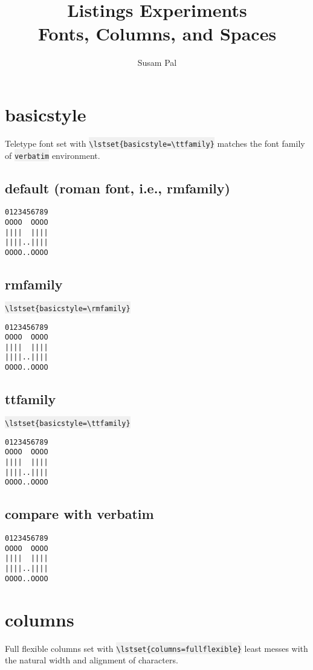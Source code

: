 \documentclass{article}
\title{Listings Experiments \\ Fonts, Columns, and Spaces}
\author{Susam Pal}
\newcommand{\bs}{\textbackslash}
\newcommand{\ttt}[1]{\colorbox[HTML]{f0f0f0}{\texttt{#1}}}
\begin{document}
\maketitle
\tableofcontents
\pagebreak

\section{basicstyle}
Teletype font set with \ttt{\bs{}lstset\{basicstyle=\bs{}ttfamily\}}
matches the font family of \ttt{verbatim} environment.

\subsection{default (roman font, i.e., rmfamily)}

{
\begin{lstlisting}
0123456789
OOOO  OOOO
||||  ||||
||||..||||
OOOO..OOOO
\end{lstlisting}
}

\subsection{rmfamily}
\ttt{\bs{}lstset\{basicstyle=\bs{}rmfamily\}}

{
\lstset{basicstyle=\rmfamily}
\begin{lstlisting}
0123456789
OOOO  OOOO
||||  ||||
||||..||||
OOOO..OOOO
\end{lstlisting}
}

\subsection{ttfamily}
\ttt{\bs{}lstset\{basicstyle=\bs{}ttfamily\}}

{
\lstset{basicstyle=\ttfamily}
\begin{lstlisting}
0123456789
OOOO  OOOO
||||  ||||
||||..||||
OOOO..OOOO
\end{lstlisting}
}

\subsection{compare with verbatim}
\begin{verbatim}
0123456789
OOOO  OOOO
||||  ||||
||||..||||
OOOO..OOOO
\end{verbatim}

\pagebreak


\section{columns}
Full flexible columns set with
\ttt{\bs{}lstset\{columns=fullflexible\}} least messes with the
natural width and alignment of characters.
\end{document}
